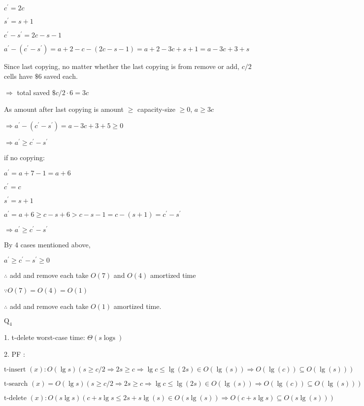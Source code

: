 \documentclass[12pt]{article}
\begin{document}
$ c^{\prime}=2 c $

$ s^{\prime}=s+1 $

$ c^{\prime}-s^{\prime}=2 c-s-1 $

$ a^{\prime}-\left(c^{\prime}-s^{\prime}\right)=a+2-c-(2 c-s-1)=a+2-3 c+s+1  =a-3 c+3+s$


Since last copying, no matter whether the last copying is from remove or add, $c / 2$ cells have $\$ 6$ saved each.

$\Rightarrow$ total saved $\$ c / 2 \cdot 6=3 c$

As amount after last copying is amount $\geqslant$ capacity-size $\geqslant 0$,
$ a \geqslant 3 c $

$ \Rightarrow a^{\prime}-\left(c^{\prime}-s^{\prime}\right)=a-3 c+3+5 \geqslant 0$

$\Rightarrow a^{\prime} \geqslant c^{\prime}-s^{\prime}$

if no copying:

$ a^{\prime}=a+7-1=a+6 $

$ c^{\prime}=c $

$ s^{\prime}=s+1 $

$ a^{\prime}=a+6 \geqslant c-s+6>c-s-1=c-(s+1)=c^{\prime}-s^{\prime} $

$ \Rightarrow a^{\prime} \geqslant c^{\prime}-s^{\prime}$



By 4 cases mentioned above,

$a^{\prime} \geqslant c^{\prime}-s^{\prime} \geqslant 0$

$\therefore$ add and remove each take $O(7)$ and $O(4)$ amortized time

$\because O(7)=O(4)=O(1)$

$\therefore$ add and remove each take $O(1)$ amortized time.

\newpage
$\text{Q}_{4}$

1. t-delete worst-case time: $\Theta(s \operatorname{logs})$

2. PF :

$\text {t-insert }(x): O(\lg s)( s \geqslant c / 2 \Rightarrow 2 s \geqslant c \Rightarrow\lg c \leq \lg (2 s) \in O(\lg (s)) \Rightarrow O(\lg (c)) \subseteq O(\lg (s))) $

$ \text {t-search }(x)=O(\lg s)( s \geqslant c / 2 \Rightarrow 2 s \geqslant c \Rightarrow\lg c \leqslant \lg (2 s) \in O(\lg (s)) \Rightarrow O(\lg (c)) \subseteq O(\lg (s))) $

$\text {t-delete }(x): O(s \lg s)(c+s \lg s \leq 2 s+s \lg (s) \in O(s \lg (s)) \Rightarrow O(c+s \lg s) \subseteq O(s \lg (s)))$
\end{document}

